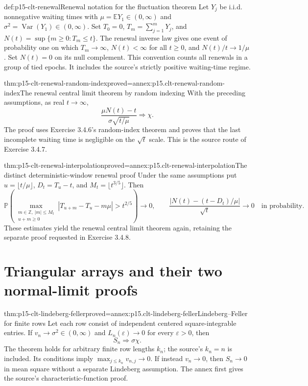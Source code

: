 \begin{hbdefinition}{def:p15-clt-renewal}{Renewal notation for the fluctuation theorem}
Let \(Y_j\) be i.i.d. nonnegative waiting times with
\(\mu=\mathbb EY_1\in(0,\infty)\) and
\(\sigma^2=\operatorname{Var}(Y_1)\in(0,\infty)\).
Set \(T_0=0\), \(T_m=\sum_{j=1}^mY_j\), and
\(N(t)=\sup\{m\geq0:T_m\leq t\}\).
The renewal inverse law gives one event of probability one on
which \(T_m\to\infty\), \(N(t)<\infty\) for all \(t\geq0\),
and \(N(t)/t\to1/\mu\). Set \(N(t)=0\) on its null complement.
This convention counts all renewals in a group of tied epochs.
It includes the source's strictly positive waiting-time regime.
\end{hbdefinition}

\begin{hbtheorem}{thm:p15-clt-renewal-random-index}{proved=annex:p15.clt-renewal-random-index}{The renewal central limit theorem by random indexing}
With the preceding assumptions, as real \(t\to\infty\),
\[
 \frac{\mu N(t)-t}{\sigma\sqrt{t/\mu}}\Rightarrow\chi.
 \]
The proof uses Exercise 3.4.6's random-index theorem and proves
that the last incomplete waiting time is negligible on the
\(\sqrt t\) scale. This is the source route of Exercise 3.4.7.
\end{hbtheorem}

\begin{hbtheorem}{thm:p15-clt-renewal-interpolation}{proved=annex:p15.clt-renewal-interpolation}{The distinct deterministic-window renewal proof}
Under the same assumptions put
\(u=\lfloor t/\mu\rfloor\), \(D_t=T_u-t\), and
\(M_t=\lfloor t^{3/5}\rfloor\). Then
\[
 \mathbb P\left(
  \max_{\substack{m\in\mathbb Z,\ |m|\leq M_t\\u+m\geq0}}
  |T_{u+m}-T_u-m\mu|>t^{2/5}\right)\longrightarrow0,
 \qquad
 \frac{|N(t)-(t-D_t)/\mu|}{\sqrt t}\longrightarrow0
                                        \quad\text{in probability}.
 \]
These estimates yield the renewal central limit theorem again,
retaining the separate proof requested in Exercise 3.4.8.
\end{hbtheorem}

\section{Triangular arrays and their two normal-limit proofs}
\label{sec:p15-clt-arrays}

\begin{hbtheorem}{thm:p15-clt-lindeberg-feller}{proved=annex:p15.clt-lindeberg-feller}{Lindeberg--Feller for finite rows}
Let each row consist of independent centered square-integrable entries.
If \(v_n\to\sigma^2\in(0,\infty)\) and
\(L_n(\varepsilon)\to0\) for every \(\varepsilon>0\), then
\[
 S_n\Rightarrow\sigma\chi.
 \]
The theorem holds for arbitrary finite row lengths \(k_n\);
the source's \(k_n=n\) is included. Its conditions imply
\(\max_{j\leq k_n}v_{n,j}\to0\).
If instead \(v_n\to0\), then \(S_n\to0\) in mean square
without a separate Lindeberg assumption.
The annex first gives the source's characteristic-function proof.
\end{hbtheorem}

